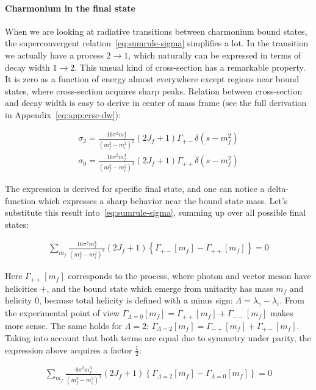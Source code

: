 \paragraph{Charmonium in the final state}
When we are looking at radiative transitions between charmonium bound states, the superconvergent relation~\cref{eq:sumrule-sigma} simplifies a lot. In the transition we actually have a process $2 \rightarrow 1$, which naturally can be expressed in terms of decay width $1 \rightarrow 2$. This unsual kind of cross-section has a remarkable property. It is zero as a function of energy almost everywhere except regions near bound states, where cross-section acquires sharp peaks. Relation between cross-section and decay width is easy to derive in center of mass frame (see the full derivation in Appendix~\cref{eq:app:crsc-dw}):

\begin{align} \label{eq:crsc-dw}
    \sigma_{2} = \frac{16 \pi^2 m_f^3}{(m_f^2 - m_i^2)^2} (2J_f + 1) \Gamma_{+-} \delta(s - m_f^2) \\
    \sigma_{0} = \frac{16 \pi^2 m_f^3}{(m_f^2 - m_i^2)^2} (2J_f + 1) \Gamma_{++} \delta(s - m_f^2)
\end{align}

The expression is derived for specific final state, and one can notice a delta-function which expresses a sharp behavior near the bound state mass. Let's substitute this result into~\cref{eq:sumrule-sigma}, summing up over all possible final states:

\begin{align}
    \sum_{m_f} \frac{16 \pi^2 m_f^3}{(m_f^2 - m_i^2)^3} (2J_f+1) \left\{ \Gamma_{+-}[m_f] - \Gamma_{++}[m_f] \right\} = 0
\end{align}

Here $\Gamma_{++}[m_f]$ corresponds to the process, where photon and vector meson have helicities $+$, and the bound state which emerge from unitarity has mass $m_f$ and helicity $0$, because total helicity is defined with a minus sign: $\Lambda = \lambda_\gamma - \lambda_i$. From the experimental point of view $\Gamma_{\Lambda=0}[m_f] = \Gamma_{++}[m_f] + \Gamma_{--}[m_f]$ makes more sense. The same holds for $\Lambda=2$: $\Gamma_{\Lambda=2}[m_f] = \Gamma_{-+}[m_f] + \Gamma_{+-}[m_f]$. Taking into account that both terms are equal due to symmetry under parity, the expression above acquires a factor $\frac{1}{2}$:


\begin{align} \label{eq:sumrule-dw-nosub}
    \sum_{m_f} \frac{8 \pi^2 m_f^3}{(m_f^2 - m_i^2)^3} (2J_f+1) \left\{\Gamma_{\Lambda=2}[m_f] - \Gamma_{\Lambda=0}[m_f] \right\} = 0
\end{align}

